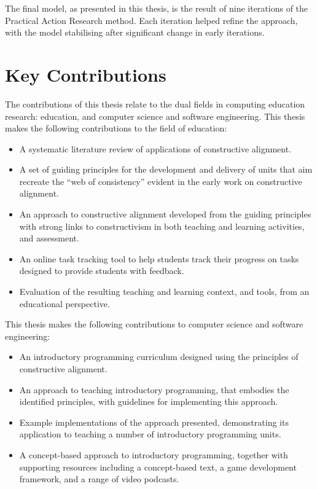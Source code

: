 The final model, as presented in this thesis, is the result of nine iterations of the Practical Action Research method. Each iteration helped refine the approach, with the model stabilising after significant change in early iterations. 


\section{Key Contributions} %
\label{sec:key_contributions}

The contributions of this thesis relate to the dual fields in computing education research: education, and computer science and software engineering. This thesis makes the following contributions to the field of education:
\begin{itemize}[noitemsep,nolistsep]
	\item A systematic literature review of applications of constructive alignment.
	\item A set of guiding principles for the development and delivery of units that aim recreate the ``web of consistency'' evident in the early work on constructive alignment. 
	\item An approach to constructive alignment developed from the guiding principles with strong links to constructivism in both teaching and learning activities, and assessment.
	\item An online task tracking tool to help students track their progress on tasks designed to provide students with feedback.
	\item Evaluation of the resulting teaching and learning context, and tools, from an educational perspective.
\end{itemize}

This thesis makes the following contributions to computer science and software engineering:
\begin{itemize}[noitemsep,nolistsep]
	\item An introductory programming curriculum designed using the principles of constructive alignment.
	\item An approach to teaching introductory programming, that embodies the identified principles, with guidelines for implementing this approach.
	\item Example implementations of the approach presented, demonstrating its application to teaching a number of introductory programming units.
	\item A concept-based approach to introductory programming, together with supporting resources including a concept-based text, a game development framework, and a range of video podcasts.
\end{itemize}

